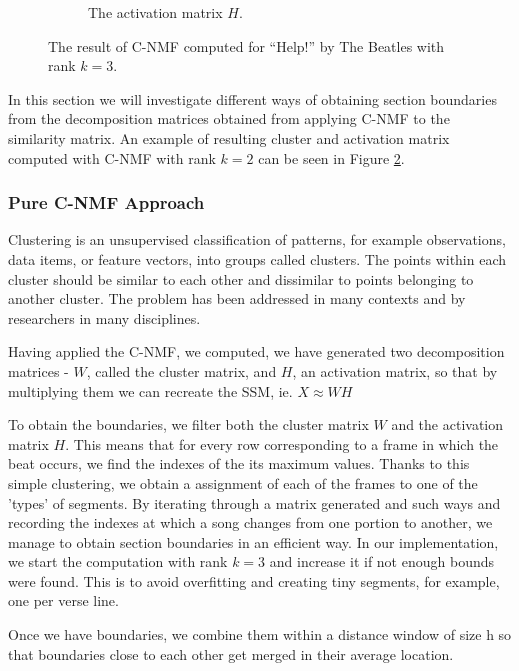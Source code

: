 \begin{figure}
\begin{subfigure}[b]{0.47\textwidth}
                \caption{The activation matrix $H$.}
                \label{fig:Hmatrix}
        \end{subfigure}
          \caption{The result of C-NMF computed for ``Help!'' by The Beatles with rank $k = 3$.}
        \label{fig:CNMFbeatles}
\end{figure}
 
In this section we will investigate different ways of obtaining section boundaries from the decomposition matrices obtained from applying C-NMF to the similarity matrix. An example of resulting cluster and activation matrix computed with C-NMF with rank $k = 2$ can be seen in Figure \ref{fig:CNMFbeatles}.

\subsubsection*{Pure C-NMF Approach}
\label{sec:finalBounds}

Clustering is an unsupervised classification of patterns, for example observations, data items, or feature vectors, into groups called clusters. The points within each cluster should be similar to each other and dissimilar to points belonging to another cluster. The problem has been addressed in many contexts and by researchers in many disciplines.

Having applied the C-NMF, we computed, we have generated two decomposition matrices - $W$, called the cluster matrix, and $H$, an activation matrix, so that by multiplying them we can recreate the SSM, ie. $X \approx  WH$       
        
To obtain the boundaries, we filter both the cluster matrix $W$ and the activation matrix $H$. This means that for every row corresponding to a frame in which the beat occurs, we find the indexes of the its maximum values. Thanks to this simple clustering, we obtain a assignment of each of the frames to one of the 'types' of segments. By iterating through a matrix generated and such ways and recording the indexes at which a song changes from one portion to another, we manage to obtain section boundaries in an efficient way. In our implementation, we start the computation with rank $k = 3$ and increase it if not enough bounds were found. This is to avoid overfitting and creating tiny segments, for example, one per verse line.

Once we have boundaries, we combine them within a distance window of size h so that boundaries close to each other get merged in their average location.

